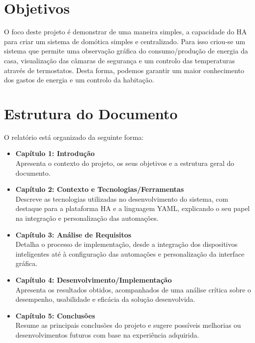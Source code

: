 \section{Objetivos}

O foco deste projeto é demonstrar de uma maneira simples, a capacidade do \gls{HA} para criar um sistema de domótica simples e centralizado. Para isso criou-se um sistema que permite uma observação gráfica do consumo/produção de energia da casa, visualização das câmaras de segurança e um controlo das temperaturas através de termostatos. Desta forma, podemos garantir um maior conhecimento dos gastos de energia e um controlo da habitação.


\section{Estrutura do Documento}

O relatório está organizado da seguinte forma:
\begin{itemize}
  \item \textbf{Capítulo 1: Introdução} \\
  Apresenta o contexto do projeto, os seus objetivos e a estrutura geral do documento.

  \item \textbf{Capítulo 2: Contexto e Tecnologias/Ferramentas} \\
  Descreve as tecnologias utilizadas no desenvolvimento do sistema, com destaque para a plataforma \gls{HA} e a linguagem \gls{YAML}, explicando o seu papel na integração e personalização das automações.

  \item \textbf{Capítulo 3: Análise de Requisitos} \\
  Detalha o processo de implementação, desde a integração dos dispositivos inteligentes até à configuração das automações e personalização da interface gráfica.

  \item \textbf{Capítulo 4: Desenvolvimento/Implementação} \\
  Apresenta os resultados obtidos, acompanhados de uma análise crítica sobre o desempenho, usabilidade e eficácia da solução desenvolvida.

  \item \textbf{Capítulo 5: Conclusões} \\
  Resume as principais conclusões do projeto e sugere possíveis melhorias ou desenvolvimentos futuros com base na experiência adquirida.
\end{itemize}